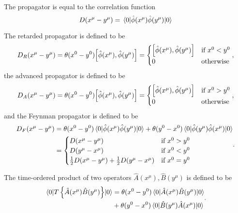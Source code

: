 \begin{lemma}\label{thm:qkg_propagator_correlation_function}
	The propagator is equal to the correlation function
	\begin{equation}
		D(x^\mu-y^\mu)
		=
		\expval{\hat\phi(x^\mu)\hat\phi(y^\mu)}{0}
	\end{equation}
\end{lemma}
\begin{definition}
	The retarded propagator is defined to be
	\begin{equation}
		D_R(x^\mu-y^\mu)
		=
		\theta(x^0-y^0)
		\comm{\hat\phi(x^\mu)}{\hat\phi(y^\mu)}
		=
		\begin{cases}
			\comm{\hat\phi(x^\mu)}{\hat\phi(y^\mu)}	& \text{if}\ x^0<y^0
			\\
			0 & \text{otherwise}
		\end{cases}
		,
	\end{equation}
	the advanced propagator is defined to be
	\begin{equation}
		D_A(x^\mu-y^\mu)
		=
		\theta(x^0-y^0)
		\comm{\hat\phi(x^\mu)}{\hat\phi(y^\mu)}
		=
		\begin{cases}
			\comm{\hat\phi(x^\mu)}{\hat\phi(y^\mu)}	& \text{if}\ x^0>y^0
			\\
			0 & \text{otherwise}
		\end{cases}
		,
	\end{equation}
	and the Feynman propagator is defined to be
	\begin{equation}
		\begin{split}
			D_F(x^\mu-y^\mu)
			&=
			\theta(x^0-y^0)
			\expval{\hat\phi(x^\mu)\hat\phi(y^\mu)}{0}
			+
			\theta(y^0-x^0)
			\expval{\hat\phi(y^\mu)\hat\phi(x^\mu)}{0}
			\\
			&=
			\begin{cases}
				D(x^\mu-y^\mu) & \text{if}\ x^0>y^0 \\
				D(y^\mu-x^\mu) & \text{if}\ x^0<y^0 \\
				\frac{1}{2}
				D(x^\mu-y^\mu)
				+
				\frac{1}{2}
				D(y^\mu-x^\mu)
				& \text{if}\ x^0=y^0
			\end{cases}
		\end{split}
		.
	\end{equation}
\end{definition}
\begin{definition}
	The time-ordered product of two operators $\hat{A}(x^\mu),\hat{B}(y^\mu)$ is defined to be
	\begin{equation}
		\begin{split}
			\expval{T\left\{\hat{A}(x^\mu)\hat{B}(y^\mu)\right\}}{0}
			&=
			\theta(x^0-y^0)
			\expval{\hat{A}(x^\mu)\hat{B}(y^\mu)}{0}
			\\
			&+
			\theta(y^0-x^0)
			\expval{\hat{B}(y^\mu)\hat{A}(x^\mu)}{0}
		\end{split}
		.		
	\end{equation}
\end{definition}
